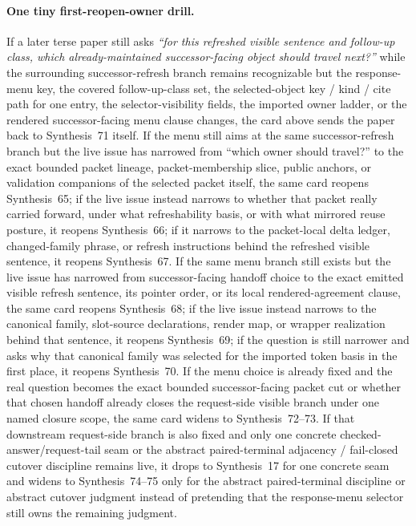 \documentclass[11pt]{article}
\begin{document}
\paragraph{One tiny first-reopen-owner drill.}
If a later terse paper still asks \emph{``for this refreshed visible sentence and follow-up class, which already-maintained successor-facing object should travel next?''} while the surrounding successor-refresh branch remains recognizable but the response-menu key, the covered follow-up-class set, the selected-object key / kind / cite path for one entry, the selector-visibility fields, the imported owner ladder, or the rendered successor-facing menu clause changes, the card above sends the paper back to Synthesis~71 itself. If the menu still aims at the same successor-refresh branch but the live issue has narrowed from ``which owner should travel?'' to the exact bounded packet lineage, packet-membership slice, public anchors, or validation companions of the selected packet itself, the same card reopens Synthesis~65; if the live issue instead narrows to whether that packet really carried forward, under what refreshability basis, or with what mirrored reuse posture, it reopens Synthesis~66; if it narrows to the packet-local delta ledger, changed-family phrase, or refresh instructions behind the refreshed visible sentence, it reopens Synthesis~67. If the same menu branch still exists but the live issue has narrowed from successor-facing handoff choice to the exact emitted visible refresh sentence, its pointer order, or its local rendered-agreement clause, the same card reopens Synthesis~68; if the live issue instead narrows to the canonical family, slot-source declarations, render map, or wrapper realization behind that sentence, it reopens Synthesis~69; if the question is still narrower and asks why that canonical family was selected for the imported token basis in the first place, it reopens Synthesis~70. If the menu choice is already fixed and the real question becomes the exact bounded successor-facing packet cut or whether that chosen handoff already closes the request-side visible branch under one named closure scope, the same card widens to Synthesis~72--73. If that downstream request-side branch is also fixed and only one concrete checked-answer/request-tail seam or the abstract paired-terminal adjacency / fail-closed cutover discipline remains live, it drops to Synthesis~17 for one concrete seam and widens to Synthesis~74--75 only for the abstract paired-terminal discipline or abstract cutover judgment instead of pretending that the response-menu selector still owns the remaining judgment.\cite{series:publicrequestresponsepackets,series:publicrequestresponsepacketcarryforward,series:publicrequestresponsepacketdeltas,series:publicrequestresponsepacketrefreshnotices,series:publicrequestresponsepacketrefreshnoticenormalforms,series:publicrequestresponsepacketrefreshnoticeselections,series:publicrequestresponsepacketrefreshresponsepackets,series:publicrequestresponsepacketrefreshresponsepacketclosureverdicts,series:pairedterminalcitationdiscipline,series:pairedterminalcutoverrule}
\end{document}
